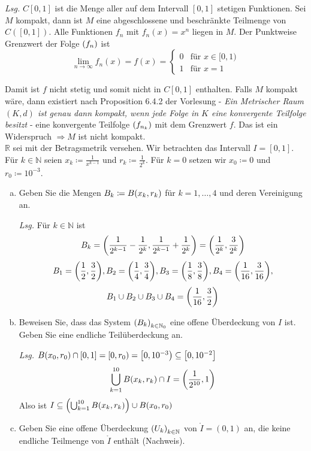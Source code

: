 \documentclass{scrreprt}
\begin{document}
\textit{Lsg.} $C[0, 1]$ ist die Menge aller auf dem Intervall $[0, 1]$ stetigen
Funktionen.
Sei $M$ kompakt, dann ist $M$ eine abgeschlossene und beschränkte Teilmenge von
$C([0, 1])$.
Alle Funktionen $f_n$ mit $f_n(x) = x^n$ liegen in $M$.
Der Punktweise Grenzwert der Folge $\qty(f_n)$ ist
\[
  \lim_{n \to \infty} f_n(x) = f(x) = \begin{cases}
    0 & \text{für } x \in [0, 1) \\
    1 & \text{für } x = 1
  \end{cases}
\]

Damit ist $f$ nicht stetig und somit nicht in $C[0, 1]$ enthalten.
Falls $M$ kompakt wäre, dann existiert nach Proposition 6.4.2 der Vorlesung -
\textit{Ein Metrischer Raum $(K, d)$ ist genau dann kompakt, wenn jede Folge in
  $K$ eine konvergente Teilfolge besitzt} - eine konvergente Teilfolge
$\qty(f_{n_k})$ mit dem Grenzwert $f$.
Das ist ein Widerspruch $\Rightarrow M$ ist nicht kompakt. \\

\noindent
$\mathbb{R}$ sei mit der Betragsmetrik versehen.
Wir betrachten das Intervall $I = [0, 1]$.
Für $k \in \mathbb{N}$ seien $x_k \coloneqq \frac{1}{x^{k - 1}}$ und
$r_k \coloneqq \frac{1}{2^k}$.
Für $k = 0$ setzen wir $x_0 \coloneqq 0$ und $r_0 \coloneqq 10^{-3}$.
\begin{enumerate}[a)]
\item Geben Sie die Mengen $B_k \coloneqq B\qty(x_k, r_k)$ für
  $k = 1, \ldots, 4$ und deren Vereinigung an.

  \textit{Lsg.} Für $k \in \mathbb{N}$ ist
  \[
    B_k = \qty(\frac{1}{2^{k - 1}} - \frac{1}{2^k}, \frac{1}{2^{k - 1}} + \frac{1}{2^k}) =
    \qty(\frac{1}{2^k}, \frac{3}{2^k})
  \]
  \[
    B_1 = \qty(\frac{1}{2}, \frac{3}{2}), B_2 = \qty(\frac{1}{4}, \frac{3}{4}),
    B_3 = \qty(\frac{1}{8}, \frac{3}{8}), B_4 = \qty(\frac{1}{16}, \frac{3}{16}),
  \]
  \[
    B_1 \cup B_2 \cup B_3 \cup B_4 = \qty(\frac{1}{16}, \frac{3}{2})
  \]

\item Beweisen Sie, dass das System $\qty(B_k)_{k \in \mathbb{N}_0}$ eine
  offene Überdeckung von $I$ ist.
  Geben Sie eine endliche Teilüberdeckung an.

  \textit{Lsg.} $B\qty(x_0, r_0) \cap [0, 1] = \left[0, r_0\right) = \left[0, 10^{-3}\right) \subseteq \qty[0, 10^{-2}]$
  \[
    \bigcup_{k = 1}^{10} B\qty(x_k, r_k) \cap I = \qty(\frac{1}{2^{10}}, 1)
  \]
  Also ist $I \subseteq \qty(\bigcup_{k = 1}^{10} B\qty(x_k, r_k)) \cup B\qty(x_0, r_0)$

\item Geben Sie eine offene Überdeckung $\qty(U_k)_{k \in \mathbb{N}}$ von
  $\mathring I = (0, 1)$ an, die keine endliche Teilmenge von $\mathring I$
  enthält (Nachweis).

\end{enumerate}
\end{document}
